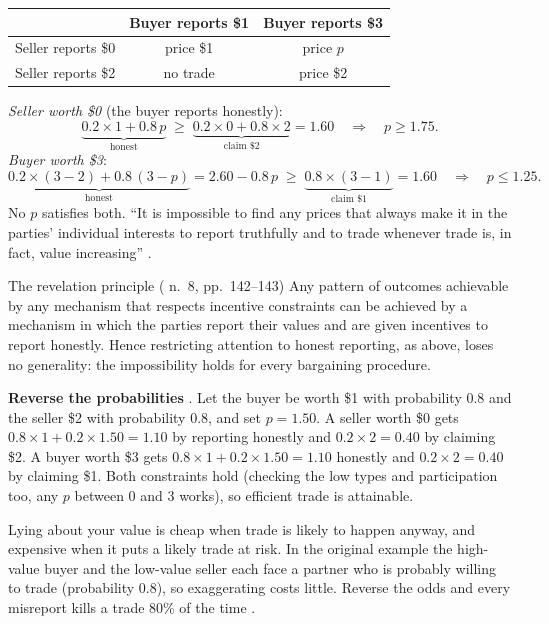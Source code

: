 \begin{center}
\begin{tabular}{lcc}
\toprule
 & Buyer reports \$1 & Buyer reports \$3 \\
\midrule
Seller reports \$0 & price \$1 & price $p$ \\
Seller reports \$2 & no trade & price \$2 \\
\bottomrule
\end{tabular}
\end{center}

\emph{Seller worth \$0} (the buyer reports honestly):
\[
  \underbrace{0.2 \times 1 + 0.8\,p}_{\text{honest}} \;\ge\;
  \underbrace{0.2 \times 0 + 0.8 \times 2}_{\text{claim \$2}} = 1.60
  \quad\Longrightarrow\quad p \ge 1.75 .
\]
\emph{Buyer worth \$3}:
\[
  \underbrace{0.2 \times (3 - 2) + 0.8\,(3 - p)}_{\text{honest}} = 2.60 - 0.8\,p \;\ge\;
  \underbrace{0.8 \times (3 - 1)}_{\text{claim \$1}} = 1.60
  \quad\Longrightarrow\quad p \le 1.25 .
\]
No $p$ satisfies both. ``It is impossible to find any prices that always make it in the parties'
individual interests to report truthfully and to trade whenever trade is, in fact, value
increasing'' .

\begin{defn}{The revelation principle (\MR{} n.~8, pp.~142--143)}
Any pattern of outcomes achievable by any mechanism that respects incentive constraints can be
achieved by a mechanism in which the parties report their values and are given incentives to
report honestly. Hence restricting attention to honest reporting, as above, loses no generality:
the impossibility holds for every bargaining procedure.
\end{defn}

\textbf{Reverse the probabilities} . Let the buyer be worth \$1 with probability 0.8 and
the seller \$2 with probability 0.8, and set $p = 1.50$. A seller worth \$0 gets
$0.8 \times 1 + 0.2 \times 1.50 = 1.10$ by reporting honestly and $0.2 \times 2 = 0.40$ by
claiming \$2. A buyer worth \$3 gets $0.8 \times 1 + 0.2 \times 1.50 = 1.10$ honestly and
$0.2 \times 2 = 0.40$ by claiming \$1. Both constraints hold (checking the low types and participation
too, any $p$ between 0 and 3 works), so efficient trade is attainable.

\begin{keyidea}
Lying about your value is cheap when trade is likely to happen anyway, and expensive when it puts
a likely trade at risk. In the original example the high-value buyer and the low-value seller
each face a partner who is probably willing to trade (probability 0.8), so exaggerating costs
little. Reverse the odds and every misreport kills a trade 80\% of the time .
\end{keyidea}


